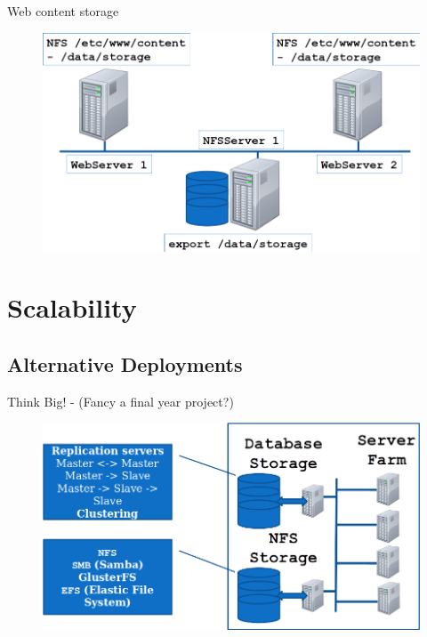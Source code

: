 \documentclass[xcolor=table]{beamer}
\begin{document}
\begin{frame}{Web content storage}
  \begin{figure}
    \begin{center}
      \includegraphics[width=1\linewidth]{webstorage.png}
    \end{center}
  \end{figure}
\end{frame}

\section{Scalability}
\subsection{Alternative Deployments}
\begin{frame}{Think Big! - \small{(Fancy a final year project?)}}
  \begin{figure}
    \begin{center}
      \includegraphics[width=1\linewidth]{Scalability.png}
    \end{center}
  \end{figure}
\end{frame}
\end{document}
